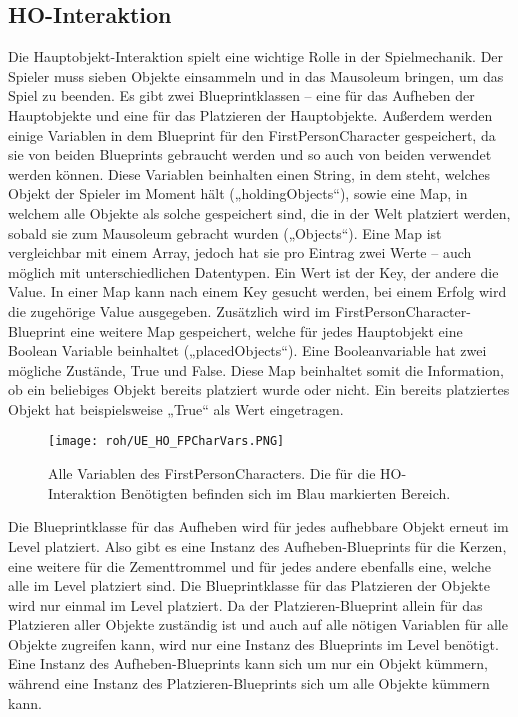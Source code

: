 \subsection{HO-Interaktion}
Die Hauptobjekt-Interaktion spielt eine wichtige Rolle in der Spielmechanik. Der Spieler muss sieben Objekte einsammeln und in das Mausoleum bringen, um das Spiel zu beenden.
Es gibt zwei Blueprintklassen – eine für das Aufheben der Hauptobjekte und eine für das Platzieren der Hauptobjekte. Außerdem werden einige Variablen in dem Blueprint für den FirstPersonCharacter gespeichert, da sie von beiden Blueprints gebraucht werden und so auch von beiden verwendet werden können. Diese Variablen beinhalten einen String, in dem steht, welches Objekt der Spieler im Moment hält („holdingObjects“), sowie eine Map, in welchem alle Objekte als solche gespeichert sind, die in der Welt platziert werden, sobald sie zum Mausoleum gebracht wurden („Objects“). Eine Map ist vergleichbar mit einem Array, jedoch hat sie pro Eintrag zwei Werte – auch möglich mit unterschiedlichen Datentypen. Ein Wert ist der Key, der andere die Value. In einer Map kann nach einem Key gesucht werden, bei einem Erfolg wird die zugehörige Value ausgegeben.
Zusätzlich wird im FirstPersonCharacter-Blueprint eine weitere Map gespeichert, welche für jedes Hauptobjekt eine Boolean Variable beinhaltet („placedObjects“). Eine Booleanvariable hat zwei mögliche Zustände, True und False. Diese Map beinhaltet somit die Information, ob ein beliebiges Objekt bereits platziert wurde oder nicht. Ein bereits platziertes Objekt hat beispielsweise „True“ als Wert eingetragen.
\begin{figure}[H]
    \centering
    \texttt{[image: roh/UE\_HO\_FPCharVars.PNG]}
    \caption{Alle Variablen des FirstPersonCharacters. Die für die HO-Interaktion Benötigten befinden sich im Blau markierten Bereich.}
    \label{UE:HO_FPCharVars}
\end{figure}
Die Blueprintklasse für das Aufheben wird für jedes aufhebbare Objekt erneut im Level platziert. Also gibt es eine Instanz des Aufheben-Blueprints für die Kerzen, eine weitere für die Zementtrommel und für jedes andere ebenfalls eine, welche alle im Level platziert sind.
Die Blueprintklasse für das Platzieren der Objekte wird nur einmal im Level platziert. Da der Platzieren-Blueprint allein für das Platzieren aller Objekte zuständig ist und auch auf alle nötigen Variablen für alle Objekte zugreifen kann, wird nur eine Instanz des Blueprints im Level benötigt.
Eine Instanz des Aufheben-Blueprints kann sich um nur ein Objekt kümmern, während eine Instanz des Platzieren-Blueprints sich um alle Objekte kümmern kann.

